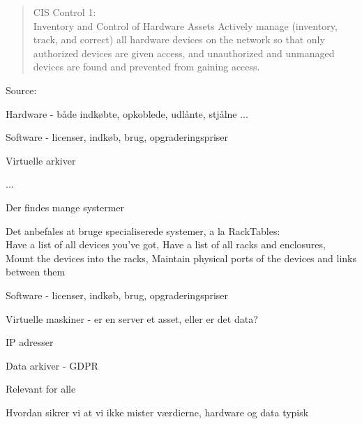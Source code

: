 \documentclass[Screen16to9,17pt]{foils}
\begin{document}

\begin{quote}
CIS Control 1:\\
Inventory and Control of Hardware Assets
Actively manage (inventory, track, and correct) all hardware devices on the network so that only
authorized devices are given access, and unauthorized and unmanaged devices are found and
prevented from gaining access.
\end{quote}
Source: 

\begin{list2}
\item Hardware - både indkøbte, opkoblede, udlånte, stjålne ...
\item Software - licenser, indkøb, brug, opgraderingspriser
\item Virtuelle arkiver
\item ...
\end{list2}



\begin{list2}
\item Der findes mange systermer
\item Det anbefales at bruge specialiserede systemer, a la RackTables:\\
Have a list of all devices you've got,
Have a list of all racks and enclosures,
Mount the devices into the racks,
Maintain physical ports of the devices and links between them
\end{list2}



\begin{list2}
\item Software - licenser, indkøb, brug, opgraderingspriser
\item Virtuelle maskiner - er en server et asset, eller er det data?
\item IP adresser
\item Data arkiver - GDPR
\end{list2}



\begin{list2}
\item Relevant for alle
\item Hvordan sikrer vi at vi ikke mister værdierne, hardware og data typisk
\end{list2}
\end{document}
